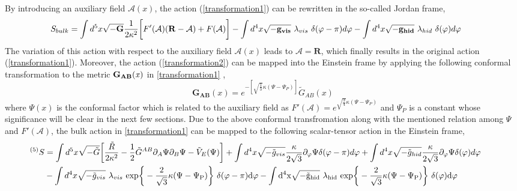 \documentclass{article}
\begin{document}
By introducing an auxiliary field $\mathcal{A}(x)$, the action (\ref{transformation1}) can be rewritten in the so-called Jordan frame,
\begin{eqnarray}
\hspace{-0.6cm}
 S_{bulk} = \int d^5x \sqrt{-\mathbf{G}}\frac{1}{2\kappa^2}\bigg[F'(\mathcal{A})(\mathbf{\mathbf{R}}-\mathcal{A}) + F(\mathcal{A})\bigg] - \int d^4 x \sqrt{-\mathbf{g_{vis}}}~\lambda_{vis} ~\delta(\varphi-\pi)d\varphi - \int d^4 x \sqrt{-\mathbf{g_{hid}}} ~\lambda_{hid}~ \delta(\varphi)d\varphi 
 \label{transformation2}
\end{eqnarray}
The variation of this action with respect to the auxiliary field $\mathcal{A}(x)$ leads to $\mathcal{A} = \mathbf{R}$, which finally results in the original action (\ref{transformation1}). Moreover, the action (\ref{transformation2}) 
can be mapped into the Einstein frame by applying the following conformal transformation to the metric $\it{\mathbf{G_{AB}}}(x)$ in \ref{transformation1} \cite{PhysRevD.65.023521,RevModPhys.82.451,DeFelice2010,PhysRevD.92.026008,0264-9381-14-12-010,BARROW1988515,1475-7516-2005-04-014,PhysRevD.76.084039,1475-7516-2013-10-040},
\begin{equation}
 \mathbf{G_{AB}}(x) = e^{-[\sqrt{\frac{1}{3}}\kappa(\Psi-\Psi_P)]} \tilde{G}_{AB}(x)
 \label{transformation3}
\end{equation}
where $\Psi(x)$ is the conformal factor which is related to the auxiliary field as $F'(\mathcal{A}) = e^{\sqrt{\frac{3}{4}}\kappa(\Psi-\Psi_P)}$ and $\Psi_P$ is a constant whose significance will be clear in the next few sections. Due to the above conformal 
transfromation along with the mentioned relation among $\Psi$ and $F'(\mathcal{A})$, the bulk action in \ref{transformation1} can be mapped to the following scalar-tensor action in the Einstein frame,
\begin{align}
\hspace{-2.4cm}
^{(5)}S&=\int d^5x \sqrt{-\tilde{G}}\bigg[\frac{\tilde{R}}{2\kappa^2} - \frac{1}{2}\tilde{G}^{AB}\partial_{A}\Psi \partial_{B}\Psi - \tilde{ V}_E(\Psi)\bigg] + \int d^4 x \sqrt{-\tilde{g}_{vis}} \frac{\kappa}{2\sqrt{3}} \partial_\varphi \Psi\delta(\varphi-\pi) d\varphi +  \int d^4 x \sqrt{-\tilde{g}_{hid}} \frac{\kappa}{2\sqrt{3}} \partial_\varphi \Psi\delta(\varphi) d\varphi
\nonumber \\
&- \int d^4 x \sqrt{-\tilde{g}_{vis}}~\lambda_{vis} ~\rm exp\bigg\lbrace-{{\frac{2}{\sqrt{3}}}\kappa(\Psi-\Psi_P)}\bigg\rbrace ~\delta(\varphi-\pi) d\varphi- \int d^4 x \sqrt{-\tilde{g}_{hid}} ~\lambda_{hid}~\rm exp\bigg\lbrace -{{\frac{2}{\sqrt{3}}}\kappa(\Psi-\Psi_P)}\bigg\rbrace~ \delta(\varphi)d\varphi
 \label{transformation4}
\end{align}
\end{document}
